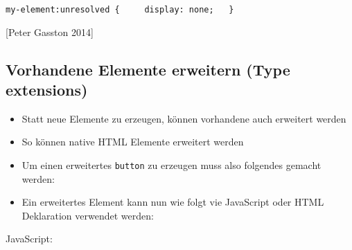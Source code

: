 \texttt{my-element:unresolved\ \{\ \ \ \ \ display:\ none;\ \ \ \}}

{[}Peter Gasston 2014{]}

\subsection{Vorhandene Elemente erweitern (Type
extensions)}\label{vorhandene-elemente-erweitern-type-extensions}

\begin{itemize}
\tightlist
\item
  Statt neue Elemente zu erzeugen, können vorhandene auch erweitert
  werden
\item
  So können native HTML Elemente erweitert werden
\item
  Um einen erweitertes \texttt{button} zu erzeugen muss also folgendes
  gemacht werden:
\end{itemize}

\begin{Shaded}
\begin{Highlighting}[]
 \OperatorTok{=} \NormalTok{(}\OperatorTok{,} \OperatorTok{\{}
  \OperatorTok{:} \NormalTok{(}\NormalTok{)}\OperatorTok{,}
  \OperatorTok{:} 
\OperatorTok{\}}\NormalTok{)}\OperatorTok{;}
\end{Highlighting}
\end{Shaded}

\begin{itemize}
\tightlist
\item
  Ein erweitertes Element kann nun wie folgt vie JavaScript oder HTML
  Deklaration verwendet werden:
\end{itemize}

JavaScript:

\begin{Shaded}
\begin{Highlighting}[]
 \OperatorTok{=} \NormalTok{(}\OperatorTok{,} \NormalTok{)}\OperatorTok{;}


 \OperatorTok{=}  \NormalTok{()}\OperatorTok{;}
\end{Highlighting}
\end{Shaded}

